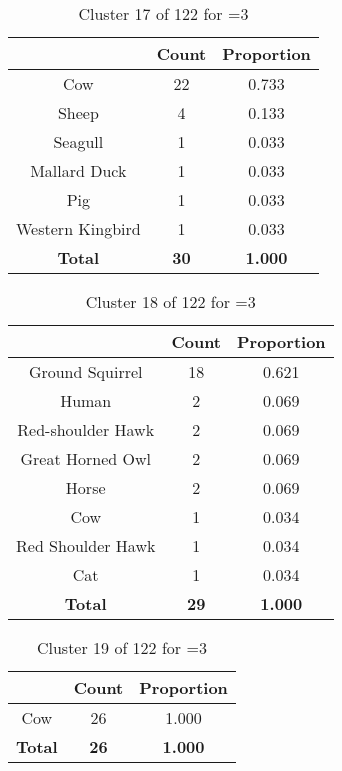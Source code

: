 \begin{table}[ht!]
\centering
\begin{tabular}{|c|c|c|}
\hline
\bf \Spec{} &\bf Count &\bf Proportion\\ \hline \hline
Cow & 22 & 0.733\\ \hline
Sheep & 4 & 0.133\\ \hline
Seagull & 1 & 0.033\\ \hline
Mallard Duck & 1 & 0.033\\ \hline
Pig & 1 & 0.033\\ \hline
Western Kingbird & 1 & 0.033\\ \hline
\hline
\bf Total & \bf 30 & \bf 1.000\\ \hline
\end{tabular}
\label{tab:cluster:17:3}
\caption{Cluster 17 of 122 for \minneigh{}=3}
\end{table}

\begin{table}[ht!]
\centering
\begin{tabular}{|c|c|c|}
\hline
\bf \Spec{} &\bf Count &\bf Proportion\\ \hline \hline
Ground Squirrel & 18 & 0.621\\ \hline
Human & 2 & 0.069\\ \hline
Red-shoulder Hawk & 2 & 0.069\\ \hline
Great Horned Owl & 2 & 0.069\\ \hline
Horse & 2 & 0.069\\ \hline
Cow & 1 & 0.034\\ \hline
Red Shoulder Hawk & 1 & 0.034\\ \hline
Cat & 1 & 0.034\\ \hline
\hline
\bf Total & \bf 29 & \bf 1.000\\ \hline
\end{tabular}
\label{tab:cluster:18:3}
\caption{Cluster 18 of 122 for \minneigh{}=3}
\end{table}

\begin{table}[ht!]
\centering
\begin{tabular}{|c|c|c|}
\hline
\bf \Spec{} &\bf Count &\bf Proportion\\ \hline \hline
Cow & 26 & 1.000\\ \hline
\hline
\bf Total & \bf 26 & \bf 1.000\\ \hline
\end{tabular}
\label{tab:cluster:19:3}
\caption{Cluster 19 of 122 for \minneigh{}=3}
\end{table}


